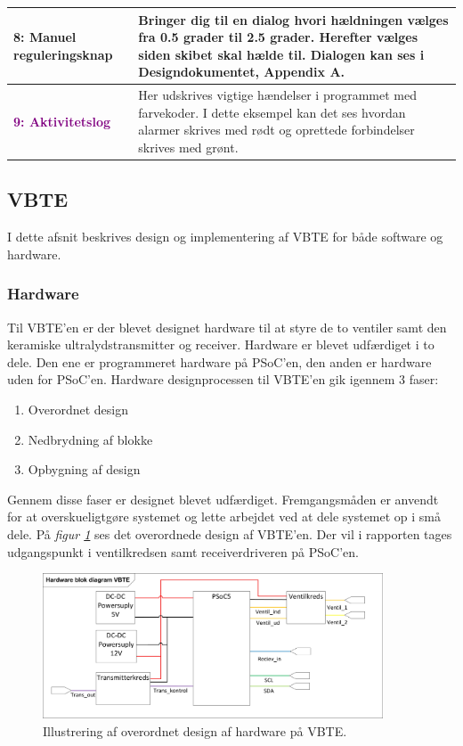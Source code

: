 \begin{table}[H]
\begin{center}
\begin{tabular}{| l | p{9.5cm} | }
\textcolor{BlueGreen}{\textbf{8: Manuel reguleringsknap}}
&Bringer dig til en dialog hvori hældningen vælges fra 0.5 grader til 2.5 grader. Herefter vælges siden skibet skal hælde til. Dialogen kan ses i Designdokumentet, Appendix A.\\\hline

\textcolor{purple}{\textbf{9: Aktivitetslog}}
&Her udskrives vigtige hændelser i programmet med farvekoder. I dette eksempel kan det ses hvordan alarmer skrives med rødt og oprettede forbindelser skrives med grønt.\\\hline

\end{tabular}
\label{tabel:ki-elementer}
\end{center}
\end{table}

\subsection{VBTE}
I dette afsnit beskrives design og implementering af VBTE for både software og hardware. 
\subsubsection{Hardware}
Til VBTE'en er der blevet designet hardware til at styre de to ventiler samt den keramiske ultralydstransmitter og receiver. Hardware er blevet udfærdiget i to dele. Den ene er programmeret hardware på PSoC'en, den anden er hardware uden for PSoC'en. Hardware designprocessen til VBTE'en gik igennem 3 faser:
\begin{enumerate}
\item Overordnet design
\item Nedbrydning af blokke
\item Opbygning af design
\end{enumerate}
Gennem disse faser er designet blevet udfærdiget. Fremgangsmåden er anvendt for at overskueligtgøre systemet og lette arbejdet ved at dele systemet op i små dele. På \textit{figur \ref{fig:HWVBTE}} ses det overordnede design af VBTE'en. Der vil i rapporten tages udgangspunkt i ventilkredsen samt receiverdriveren på PSoC'en.
\begin{figure}[H]
\centering
\includegraphics[width = 0.9\textwidth]{billeder/HWVBTE}
\caption{Illustrering af overordnet design af hardware på VBTE.}
\label{fig:HWVBTE}
\end{figure}
